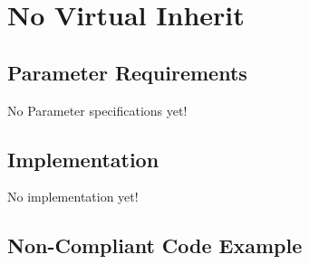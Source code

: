 %
%

\section{No Virtual Inherit}
\label{NoVirtualInherit::overview}


\subsection{Parameter Requirements}

   No Parameter specifications yet!

\subsection{Implementation}

   No implementation yet!

\subsection{Non-Compliant Code Example}


